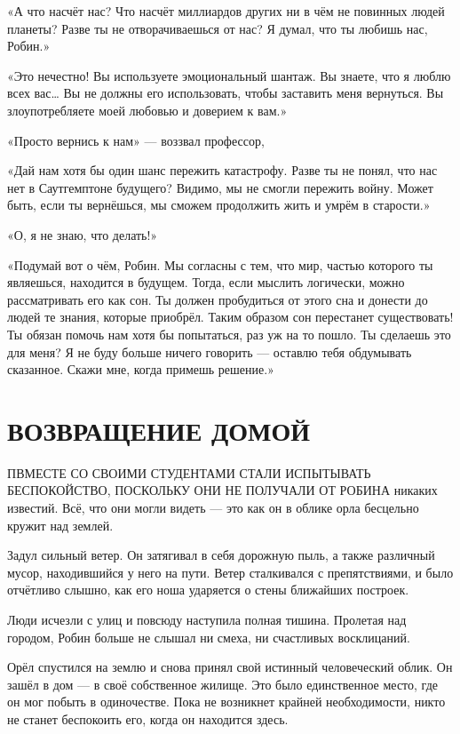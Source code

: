 \documentclass[a5paper, 9pt,
final, openany, twoside=true]{memoir}
\begin{document}
«А что насчёт нас? Что насчёт миллиардов других ни в чём не повинных людей планеты? Разве ты не отворачиваешься от нас? Я думал, что ты любишь нас, Робин.»

«Это нечестно! Вы используете эмоциональный шантаж. Вы знаете, что я люблю всех вас… Вы не должны его использовать, чтобы заставить меня вернуться. Вы злоупотребляете моей любовью и доверием к вам.»

«Просто вернись к нам» — воззвал профессор,

«Дай нам хотя бы один шанс пережить катастрофу. Разве ты не понял, что нас нет в Саутгемптоне будущего? Видимо, мы не смогли пережить войну. Может быть, если ты вернёшься, мы сможем продолжить жить и умрём в старости.»

«О, я не знаю, что делать!»

«Подумай вот о чём, Робин. Мы согласны с тем, что мир, частью которого ты являешься, находится в будущем. Тогда, если мыслить логически, можно рассматривать его как сон. Ты должен пробудиться от этого сна и донести до людей те знания, которые приобрёл. Таким образом сон перестанет существовать! Ты обязан помочь нам хотя бы попытаться, раз уж на то пошло. Ты сделаешь это для меня? Я не буду больше ничего говорить — оставлю тебя обдумывать сказанное. Скажи мне, когда примешь решение.»

\chapter{ВОЗВРАЩЕНИЕ ДОМОЙ}
П{ ВМЕСТЕ СО СВОИМИ СТУДЕНТАМИ СТАЛИ ИСПЫТЫВАТЬ БЕСПОКОЙСТВО, ПОСКОЛЬКУ ОНИ НЕ ПОЛУЧАЛИ ОТ РОБИНА} никаких известий. Всё, что они могли видеть — это как он в облике орла бесцельно кружит над землей.

Задул сильный ветер. Он затягивал в себя дорожную пыль, а также различный мусор, находившийся у него на пути. Ветер сталкивался с препятствиями, и было отчётливо слышно, как его ноша ударяется о стены ближайших построек.

Люди исчезли с улиц и повсюду наступила полная тишина. Пролетая над городом, Робин больше не слышал ни смеха, ни счастливых восклицаний.

Орёл спустился на землю и снова принял свой истинный человеческий облик. Он зашёл в дом — в своё собственное жилище. Это было единственное место, где он мог побыть в одиночестве. Пока не возникнет крайней необходимости, никто не станет беспокоить его, когда он находится здесь.
\end{document}

